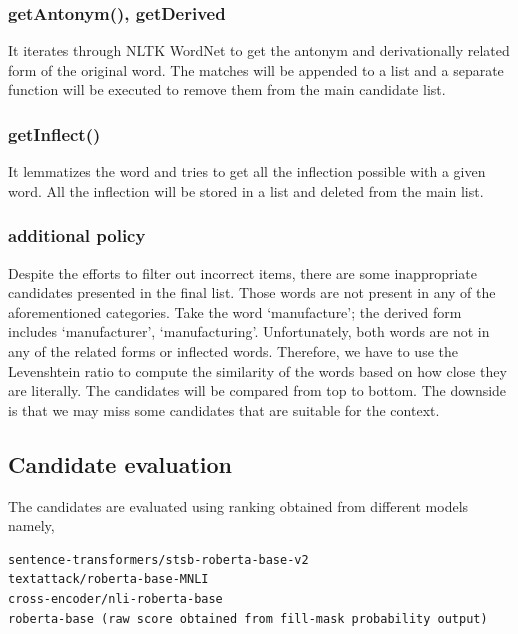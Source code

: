 \documentclass[12pt,oneside,openright,a4paper]{cpe-english-project}
\begin{document}
\subsubsection{getAntonym(), getDerived}
It iterates through NLTK WordNet to get the antonym and derivationally related form of the original word. The matches will be appended to a list and a separate function will be executed to remove them from the main candidate list.

\subsubsection{getInflect()}
It lemmatizes the word and tries to get all the inflection possible with a given word. All the inflection will be stored in a list and deleted from the main list.

\subsubsection{additional policy}
Despite the efforts to filter out incorrect items, there are some inappropriate candidates presented in the final list. Those words are not present in any of the aforementioned categories. Take the word ‘manufacture’; the derived form includes ‘manufacturer’, ‘manufacturing’. Unfortunately, both words are not in any of the related forms or inflected words. Therefore, we have to use the Levenshtein ratio to compute the similarity of the words based on how close they are literally. The candidates will be compared from top to bottom. The downside is that we may miss some candidates that are suitable for the context.

\subsection{Candidate evaluation}

The candidates are evaluated using ranking obtained from different models namely, 
\begin{verbatim}
sentence-transformers/stsb-roberta-base-v2 
textattack/roberta-base-MNLI
cross-encoder/nli-roberta-base
roberta-base (raw score obtained from fill-mask probability output)

\end{verbatim}
\end{document}
